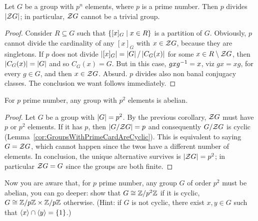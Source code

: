 \begin{corollary}
Let \(G\) be a group with \(p^n\) elements, where \(p\) is a prime number. Then \(p\) divides \(\left\lvert\mathcal Z G\right\rvert\); in particular, \(\mathcal Z G\) cannot be a trivial group.
\end{corollary}

\begin{proof}
Consider \(R \subseteq G\) such that \(\left\{[x]_G \mid x \in R\right\}\) is a partition of \(G\). Obviously, \(p\) cannot divide the cardinality of any \([x]_G\) with \(x \in \mathcal Z G\), because they are singletons. If \(p\) does not divide \(\left\lvert[x]_G\right\rvert = \left\lvert G\right\rvert / \left\lvert C_G(x)\right\rvert\) for some \(x \in R \setminus \mathcal Z G\), then \(\left\lvert C_G (x)\right\rvert = \left\lvert G\right\rvert\) and so \(C_G(x) = G\). But in this case, \(g x g^{-1} = x\), viz \(gx = xg\), for every \(g \in G\), and then \(x \in \mathcal Z G\). Absurd. \(p\) divides also non banal conjugacy classes. The conclusion we want follows immediately.
\end{proof}

\begin{corollary}
For \(p\) prime number, any group with \(p^2\) elements is abelian.
\end{corollary}

\begin{proof}
Let \(G\) be a group with \(\left\lvert G\right\rvert = p^2\). By the previous corollary, \(\mathcal Z G\) must have \(p\) or \(p^2\) elements. If it has \(p\), then \(\left\lvert G / \mathcal Z G\right\rvert = p\) and consequently \(G/\mathcal Z G\) is cyclic (Lemma~\ref{cor:GroupsWithPrimeCardAreCyclic}). This is equivalent to saying \(G = \mathcal Z G\), which cannot happen since the twos have a different number of elements. In conclusion, the unique alternative survives is \(\left\lvert\mathcal Z G\right\rvert = p^2\); in particular \(\mathcal Z G = G\) since the groups are both finite.
\end{proof}

\begin{exercise}
Now you are aware that, for \(p\) prime number, any group \(G\) of order \(p^2\) must be abelian, you can go deeper: show that \(G \cong \mathbb Z/p^2\mathbb Z\) if it is cyclic, \(G \cong \mathbb Z/p\mathbb Z \times \mathbb Z/p\mathbb Z\) otherwise. (Hint: if \(G\) is not cyclic, there exist \(x, y \in G\) such that \(\left\langle x\right\rangle \cap \left\langle y\right\rangle = \left\{1\right\}\).)
\end{exercise}